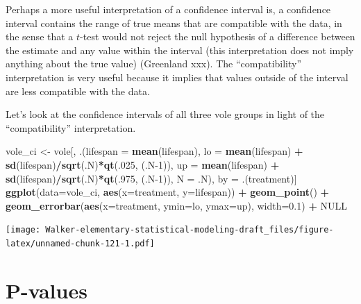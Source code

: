 \documentclass[]{book}
\newenvironment{Shaded}{\begin{snugshade}}{\end{snugshade}}
\newcommand{\DataTypeTok}[1]{\textcolor[rgb]{0.13,0.29,0.53}{#1}}
\newcommand{\DecValTok}[1]{\textcolor[rgb]{0.00,0.00,0.81}{#1}}
\newcommand{\FloatTok}[1]{\textcolor[rgb]{0.00,0.00,0.81}{#1}}
\newcommand{\KeywordTok}[1]{\textcolor[rgb]{0.13,0.29,0.53}{\textbf{#1}}}
\newcommand{\NormalTok}[1]{#1}
\newcommand{\OperatorTok}[1]{\textcolor[rgb]{0.81,0.36,0.00}{\textbf{#1}}}
\newcommand{\OtherTok}[1]{\textcolor[rgb]{0.56,0.35,0.01}{#1}}
\newcommand{\StringTok}[1]{\textcolor[rgb]{0.31,0.60,0.02}{#1}}
\begin{document}
Perhaps a more useful interpretation of a confidence interval is, a confidence interval contains the range of true means that are compatible with the data, in the sense that a \(t\)-test would not reject the null hypothesis of a difference between the estimate and any value within the interval (this interpretation does not imply anything about the true value) (Greenland xxx). The ``compatibility'' interpretation is very useful because it implies that values outside of the interval are less compatible with the data.

Let's look at the confidence intervals of all three vole groups in light of the ``compatibility'' interpretation.

\begin{Shaded}
\begin{Highlighting}[]
\NormalTok{vole_ci <-}\StringTok{ }\NormalTok{vole[, .(}\DataTypeTok{lifespan =} \KeywordTok{mean}\NormalTok{(lifespan),}
                    \DataTypeTok{lo =} \KeywordTok{mean}\NormalTok{(lifespan) }\OperatorTok{+}\StringTok{ }\KeywordTok{sd}\NormalTok{(lifespan)}\OperatorTok{/}\KeywordTok{sqrt}\NormalTok{(.N)}\OperatorTok{*}\KeywordTok{qt}\NormalTok{(.}\DecValTok{025}\NormalTok{, (.N}\DecValTok{-1}\NormalTok{)),}
                    \DataTypeTok{up =} \KeywordTok{mean}\NormalTok{(lifespan) }\OperatorTok{+}\StringTok{ }\KeywordTok{sd}\NormalTok{(lifespan)}\OperatorTok{/}\KeywordTok{sqrt}\NormalTok{(.N)}\OperatorTok{*}\KeywordTok{qt}\NormalTok{(.}\DecValTok{975}\NormalTok{, (.N}\DecValTok{-1}\NormalTok{)),}
                    \DataTypeTok{N =}\NormalTok{ .N),}
\NormalTok{                by =}\StringTok{ }\NormalTok{.(treatment)]}
\KeywordTok{ggplot}\NormalTok{(}\DataTypeTok{data=}\NormalTok{vole_ci, }\KeywordTok{aes}\NormalTok{(}\DataTypeTok{x=}\NormalTok{treatment, }\DataTypeTok{y=}\NormalTok{lifespan)) }\OperatorTok{+}
\StringTok{  }\KeywordTok{geom_point}\NormalTok{() }\OperatorTok{+}
\StringTok{  }\KeywordTok{geom_errorbar}\NormalTok{(}\KeywordTok{aes}\NormalTok{(}\DataTypeTok{x=}\NormalTok{treatment, }\DataTypeTok{ymin=}\NormalTok{lo, }\DataTypeTok{ymax=}\NormalTok{up), }
                \DataTypeTok{width=}\FloatTok{0.1}\NormalTok{) }\OperatorTok{+}
\StringTok{  }\OtherTok{NULL}
\end{Highlighting}
\end{Shaded}

\texttt{[image: Walker-elementary-statistical-modeling-draft\_files/figure-latex/unnamed-chunk-121-1.pdf]}

\hypertarget{p-values}{%
\chapter{P-values}\label{p-values}}
\end{document}
